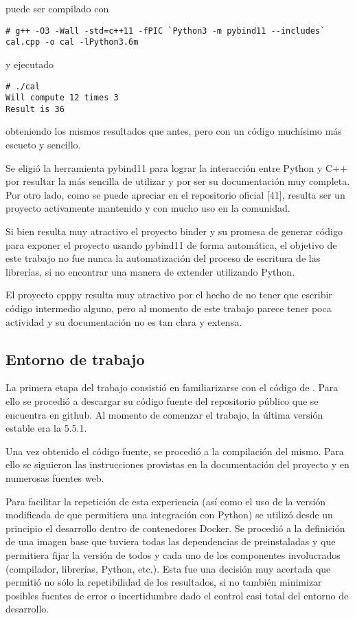\inputminted{c}{codelistings/use_multiply_pybind.c}

puede ser compilado con

\begin{verbatim}
# g++ -O3 -Wall -std=c++11 -fPIC `Python3 -m pybind11 --includes` cal.cpp -o cal -lPython3.6m
\end{verbatim}

y ejecutado

\begin{verbatim}
# ./cal
Will compute 12 times 3
Result is 36
\end{verbatim}

obteniendo los mismos resultados que antes, pero con un código muchísimo más
escueto y sencillo.

Se eligió la herramienta pybind11 para lograr la interacción entre Python y C++
por resultar la más sencilla de utilizar y por ser su documentación muy
completa. Por otro lado, como se puede apreciar en el repositorio oficial [41],
resulta ser un proyecto activamente mantenido y con mucho uso en la comunidad.

Si bien resulta muy atractivo el proyecto binder y su promesa de generar
código para exponer el proyecto usando pybind11 de forma automática, el
objetivo de este trabajo no fue nunca la automatización del proceso de
escritura de las librerías, si no encontrar una manera de extender \omnetpp{}
utilizando Python.

El proyecto cpppy resulta muy atractivo por el hecho de no tener que escribir
código intermedio alguno, pero al momento de este trabajo parece tener poca
actividad y su documentación no es tan clara y extensa.

\subsection{Entorno de trabajo}

La primera etapa del trabajo consistió en familiarizarse con el código de
\omnetpp{}. Para ello se procedió a descargar su código fuente del repositorio
público que se encuentra en github. Al momento de comenzar el trabajo, la
última versión estable era la 5.5.1.

Una vez obtenido el código fuente, se procedió a la compilación del mismo. Para
ello se siguieron las instrucciones provistas en la documentación del proyecto
y en numerosas fuentes web.

Para facilitar la repetición de esta experiencia (así como el uso de la versión
modificada de \omnetpp{} que permitiera una integración con Python) se utilizó
desde un principio el desarrollo dentro de contenedores Docker. Se procedió a
la definición de una imagen base que tuviera todas las dependencias de \omnetpp{}
preinstaladas y que permitiera fijar la versión de todos y cada uno de los
componentes involucrados (compilador, librerías, Python, etc.). Esta fue una
decisión muy acertada que permitió no sólo la repetibilidad de los resultados,
si no también minimizar posibles fuentes de error o incertidumbre dado el
control casi total del entorno de desarrollo.

